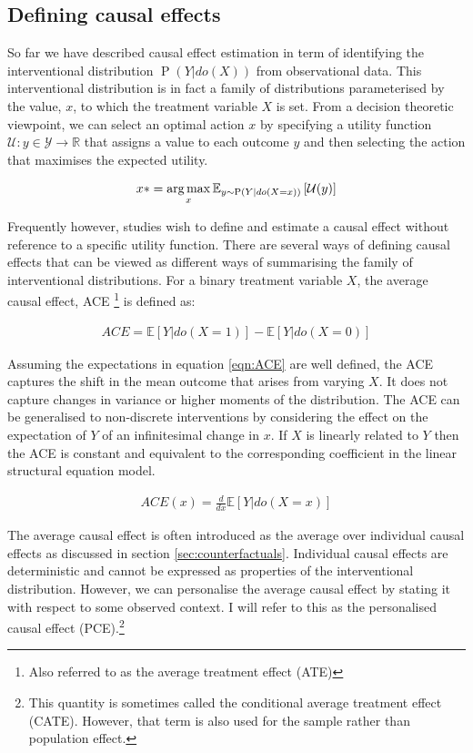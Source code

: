 \documentclass[11pt,a4paper,twoside]{report}
\newcommand{\Esub}[2]{\mathbb E_{#1}\left[{#2}\right]}
\newcommand{\E}[1]{\mathbb E\left[{#1}\right]}
\newcommand{\argmax}{\operatornamewithlimits{arg\,max}}
\newcommand{\eqn}[1]{\begin{align}#1\end{align}}
\renewcommand{\P}[1]{\operatorname{P}\left(#1\right)}
\theoremstyle{plain}
\theoremstyle{definition}
\begin{document}
\subsection{Defining causal effects} 
\label{sec:defining-causal-effects}
So far we have described causal effect estimation in term of identifying the interventional distribution $\P{Y|do(X)}$ from observational data. This interventional distribution is in fact a family of distributions parameterised by the value, $x$, to which the treatment variable $X$ is set. From a decision theoretic viewpoint, we can select an optimal action $x$ by specifying a utility function $\mathcal{U}:y \in \mathcal{Y} \rightarrow \mathbb{R}$ that assigns a value to each outcome $y$ and then selecting the action that maximises the expected utility. 

\eqn{
\label{eqn:utility_max}
x* =\argmax_x \Esub{y\sim\P{Y|do(X=x)}}{{\cal{U}}(y)}
} 

Frequently however, studies wish to define and estimate a causal effect without reference to a specific utility function. There are several ways of defining causal effects that can be viewed as different ways of summarising the family of interventional distributions. For a binary treatment variable $X$, the average causal effect, ACE \footnote{Also referred to as the average treatment effect (ATE)} is defined as:

\eqn{
\label{eqn:ACE}
ACE = \E{Y|do(X = 1)} - \E{Y|do(X=0)}
}

Assuming the expectations in equation \ref{eqn:ACE} are well defined, the ACE captures the shift in the mean outcome that arises from varying $X$. It does not capture changes in variance or higher moments of the distribution. The ACE can be generalised to non-discrete interventions by considering the effect on the expectation of $Y$ of an infinitesimal change in $x$. If $X$ is linearly related to $Y$ then the ACE is constant and equivalent to the corresponding coefficient in the linear structural equation model. 

\eqn{
\label{eqn:ACE_continuous}
ACE(x) = \frac{d}{dx}\E{Y|do(X=x)}
}


The average causal effect is often introduced as the average over individual causal effects as discussed in section \ref{sec:counterfactuals}. Individual causal effects are deterministic and cannot be expressed as properties of the interventional distribution. However, we can personalise the average causal effect by stating it with respect to some observed context. I will refer to this as the personalised causal effect (PCE).\footnote{This quantity is sometimes called the conditional average treatment effect (CATE). However, that term is also used for the sample rather than population effect.} 
\end{document}
